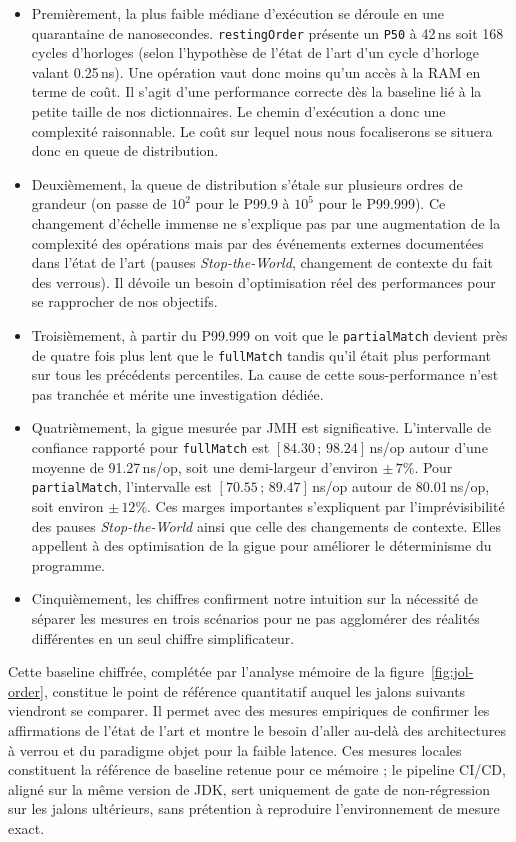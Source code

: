 \begin{itemize}
    \item Premièrement, la plus faible médiane d'exécution se déroule en une quarantaine de nanosecondes. \texttt{restingOrder} présente un \texttt{P50} à 42\,ns soit 168 cycles d'horloges (selon l'hypothèse de l'état de l'art d'un cycle d'horloge valant 0.25\,ns). Une opération vaut donc moins qu'un accès à la RAM en terme de coût. Il s'agit d'une performance correcte dès la baseline lié à la petite taille de nos dictionnaires. Le chemin d'exécution a donc une complexité raisonnable. Le coût sur lequel nous nous focaliserons se situera donc en queue de distribution.
    \item Deuxièmement, la queue de distribution s'étale sur plusieurs ordres de grandeur (on passe de $10^2$ pour le P99.9 à $10^5$ pour le P99.999). Ce changement d'échelle immense ne s'explique pas par une augmentation de la complexité des opérations mais par des événements externes documentées dans l'état de l'art (pauses \textit{Stop-the-World}, changement de contexte du fait des verrous). Il dévoile un besoin d'optimisation réel des performances pour se rapprocher de nos objectifs.
    \item Troisièmement, à partir du P99.999 on voit que le \texttt{partialMatch} devient près de quatre fois plus lent que le \texttt{fullMatch} tandis qu'il était plus performant sur tous les précédents percentiles. La cause de cette sous-performance n'est pas tranchée et mérite une investigation dédiée.
    \item Quatrièmement, la gigue mesurée par JMH est significative. L'intervalle de confiance rapporté pour \texttt{fullMatch} est $[84.30\,;\,98.24]$\,ns/op autour d'une moyenne de 91.27\,ns/op, soit une demi-largeur d'environ ${\pm}\,7\%$. Pour \texttt{partialMatch}, l'intervalle est $[70.55\,;\,89.47]$\,ns/op autour de 80.01\,ns/op, soit environ ${\pm}\,12\%$. Ces marges importantes s'expliquent par l'imprévisibilité des pauses \textit{Stop-the-World} ainsi que celle des changements de contexte. Elles appellent à des optimisation de la gigue pour améliorer le déterminisme du programme.
    \item Cinquièmement, les chiffres confirment notre intuition sur la nécessité de séparer les mesures en trois scénarios pour ne pas agglomérer des réalités différentes en un seul chiffre simplificateur. 
\end{itemize}

Cette baseline chiffrée, complétée par l'analyse mémoire de la figure~\ref{fig:jol-order}, constitue le point de référence quantitatif auquel les jalons suivants viendront se comparer. Il permet avec des mesures empiriques de confirmer les affirmations de l'état de l'art et montre le besoin d'aller au-delà des architectures à verrou et du paradigme objet pour la faible latence. Ces mesures locales constituent la référence de baseline retenue pour ce mémoire ; le pipeline CI/CD, aligné sur la même version de JDK, sert uniquement de gate de non-régression sur les jalons ultérieurs, sans prétention à reproduire l'environnement de mesure exact.